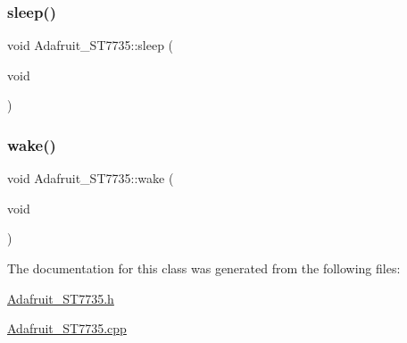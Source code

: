 \mbox{\label{class_adafruit___s_t7735_ac945c3d179185563dc2bfae09ac35375}} 
\subsubsection{\texorpdfstring{sleep()}{sleep()}}
{\footnotesize\ttfamily void Adafruit\+\_\+\+S\+T7735\+::sleep (\begin{DoxyParamCaption}\item[{void}]{ }\end{DoxyParamCaption})\hspace{0.3cm}{\ttfamily [inline]}}

\mbox{\label{class_adafruit___s_t7735_aba13f16e02307bca2b422a8b8e16b754}} 
\subsubsection{\texorpdfstring{wake()}{wake()}}
{\footnotesize\ttfamily void Adafruit\+\_\+\+S\+T7735\+::wake (\begin{DoxyParamCaption}\item[{void}]{ }\end{DoxyParamCaption})\hspace{0.3cm}{\ttfamily [inline]}}



The documentation for this class was generated from the following files\+:\begin{DoxyCompactItemize}
\item 
\hyperlink{_adafruit___s_t7735_8h}{Adafruit\+\_\+\+S\+T7735.\+h}\item 
\hyperlink{_adafruit___s_t7735_8cpp}{Adafruit\+\_\+\+S\+T7735.\+cpp}\end{DoxyCompactItemize}
